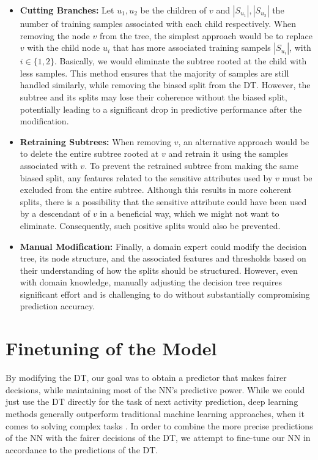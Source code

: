 \label{sec:modification}
\begin{itemize}
\item \textbf{Cutting Branches:} 
Let $u_1, u_2$ be the children of $v$ and $|S_{u_1}|, |S_{u_2}|$
the number of training samples associated with each child respectively.
When removing the node $v$ from the tree,
the simplest approach would be to replace $v$ with the child node $u_i$
that has more associated training sampels $|S_{u_i}|$, with $i \in \{1,2\}$.
Basically, we would eliminate the subtree rooted at the child with less samples.
This method ensures that the majority of samples are still handled similarly,
while removing the biased split from the DT.
However, the subtree and its splits may lose their coherence without the biased split,
potentially leading to a significant drop in predictive performance after the modification.
\item \textbf{Retraining Subtrees:}
When removing $v$, an alternative approach would be to delete the entire subtree rooted at $v$
and retrain it using the samples associated with $v$.
To prevent the retrained subtree from making the same biased split,
any features related to the sensitive attributes used by $v$ must be excluded from the entire subtree.
Although this results in more coherent splits,
there is a possibility that the sensitive attribute could have been used by a descendant of $v$ in a beneficial way,
which we might not want to eliminate.
Consequently, such positive splits would also be prevented.
\item \textbf{Manual Modification:}  
Finally, a domain expert could modify the decision tree, its node structure,
and the associated features and thresholds based on their understanding
of how the splits should be structured.
However, even with domain knowledge,
manually adjusting the decision tree requires significant effort
and is challenging to do without substantially compromising prediction accuracy.
\end{itemize}


\section{Finetuning of the Model}
By modifying the DT, our goal was to obtain a predictor that 
makes fairer decisions, while maintaining most of the NN's predictive power.
While we could just use the DT directly for the task of next activity prediction,
deep learning methods generally outperform traditional machine learning approaches,
when it comes to solving complex tasks \cite{ml_comparison}.
In order to combine the more precise predictions of the NN with the fairer decisions of the DT,
we attempt to fine-tune our NN in accordance to the predictions of the DT.

